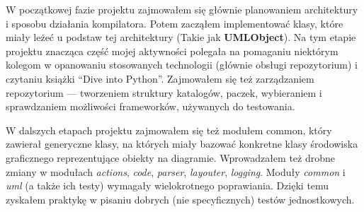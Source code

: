 W początkowej fazie projektu zajmowałem się głównie planowaniem architektury i sposobu działania kompilatora.
Potem zacząłem implementować klasy, które miały leżeć u podstaw tej architektury (Takie jak \textbf{UMLObject}).
Na tym etapie projektu znacząca część mojej aktywności polegała na pomaganiu niektórym kolegom w opanowaniu stosowanych technologii (głównie obsługi repozytorium) i czytaniu książki ``Dive into Python''.
Zajmowałem się też zarządzaniem repozytorium --- tworzeniem struktury katalogów, paczek, wybieraniem i sprawdzaniem możliwości frameworków, używanych do testowania.

W dalszych etapach projektu zajmowałem się też modułem common, który zawierał generyczne klasy, na których miały bazować konkretne klasy środowiska graficznego reprezentujące obiekty na diagramie.
Wprowadzałem też drobne zmiany w modułach \emph{actions}, \emph{code}, \emph{parser}, \emph{layouter}, \emph{logging}.
Moduły \emph{common} i \emph{uml} (a także ich testy) wymagały wielokrotnego poprawiania.
Dzięki temu zyskałem praktykę w pisaniu dobrych (nie specyficznych) testów jednostkowych.
